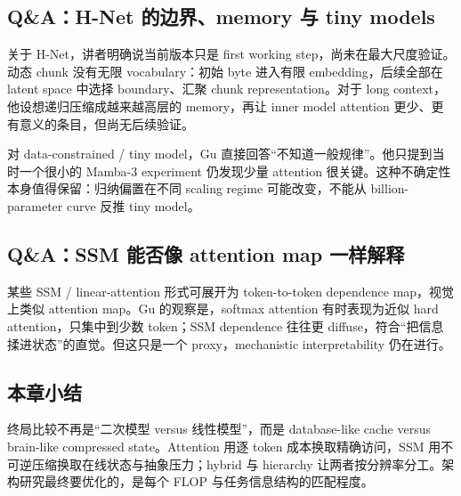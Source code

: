 \subsection{Q\&A：H-Net 的边界、memory 与 tiny models}

关于 H-Net，讲者明确说当前版本只是 first working step，尚未在最大尺度验证。动态 chunk 没有无限 vocabulary：初始 byte 进入有限 embedding，后续全部在 latent space 中选择 boundary、汇聚 chunk representation。对于 long context，他设想递归压缩成越来越高层的 memory，再让 inner model attention 更少、更有意义的条目，但尚无后续验证。


对 data-constrained / tiny model，Gu 直接回答“不知道一般规律”。他只提到当时一个很小的 Mamba-3 experiment 仍发现少量 attention 很关键。这种不确定性本身值得保留：归纳偏置在不同 scaling regime 可能改变，不能从 billion-parameter curve 反推 tiny model。

\subsection{Q\&A：SSM 能否像 attention map 一样解释}

某些 SSM / linear-attention 形式可展开为 token-to-token dependence map，视觉上类似 attention map。Gu 的观察是，softmax attention 有时表现为近似 hard attention，只集中到少数 token；SSM dependence 往往更 diffuse，符合“把信息揉进状态”的直觉。但这只是一个 proxy，mechanistic interpretability 仍在进行。


\subsection{本章小结}

终局比较不再是“二次模型 versus 线性模型”，而是 database-like cache versus brain-like compressed state。Attention 用逐 token 成本换取精确访问，SSM 用不可逆压缩换取在线状态与抽象压力；hybrid 与 hierarchy 让两者按分辨率分工。架构研究最终要优化的，是每个 FLOP 与任务信息结构的匹配程度。

